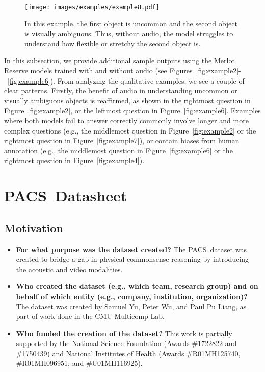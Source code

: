 \documentclass[runningheads]{llncs}
\newcommand{\names}{\textsc{PACS}}
\begin{document}
\begin{figure}[t]
    \centering
  \texttt{[image: images/examples/example8.pdf]}
  \vspace{-3mm}
  \caption{In this example, the first object is uncommon and the second object is visually ambiguous. Thus, without audio, the model struggles to understand how flexible or stretchy the second object is.}
  \label{fig:example8}
\end{figure}


\vspace{-2mm}
In this subsection, we provide additional sample outputs using the Merlot Reserve models trained with and without audio (see Figures~\ref{fig:example2}-~\ref{fig:example6}). From analyzing the qualitative examples, we see a couple of clear patterns. Firstly, the benefit of audio in understanding uncommon or visually ambiguous objects is reaffirmed, as shown in the rightmost question in Figure~\ref{fig:example2}, or the leftmost question in Figure~\ref{fig:example6}. Examples where both models fail to answer correctly commonly involve longer and more complex questions (e.g., the middlemost question in Figure~\ref{fig:example2} or the rightmost question in Figure~\ref{fig:example7}), or contain biases from human annotation (e.g., the middlemost question in Figure~\ref{fig:example6} or the rightmost question in Figure~\ref{fig:example4}). 

\clearpage

\section{\names\ Datasheet}\label{appendix:datasheet}

\subsection{Motivation} 

\begin{itemize}
    \item \textbf{For what purpose was the dataset created?} The \names\ dataset was created to bridge a gap in physical commonsense reasoning by introducing the acoustic and video modalities. 

\item \textbf{Who created the dataset (e.g., which team, research group) and on behalf of which entity (e.g., company, institution, organization)?} The dataset was created by Samuel Yu, Peter Wu, and Paul Pu Liang, as part of work done in the CMU Multicomp Lab. 

\item \textbf{Who funded the creation of the dataset?} This work is partially supported by the National Science Foundation (Awards \#1722822 and \#1750439) and National Institutes of Health (Awards \#R01MH125740, \#R01MH096951, and \#U01MH116925). 
\end{itemize}
\end{document}
